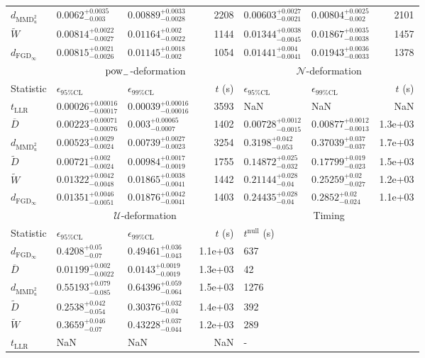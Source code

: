 \begin{tabular}{l|llr|llr}
	$d_{\mathrm{MMD}^{2}_{u}}$ & $0.0062_{-0.003}^{+0.0035}$ & $0.00889_{-0.0028}^{+0.0033}$ & 2208 & $0.00603_{-0.0021}^{+0.0027}$ & $0.00804_{-0.002}^{+0.0025}$ & 2101 \\
	$\widetilde{W}$ & $0.00814_{-0.0027}^{+0.0022}$ & $0.01164_{-0.0022}^{+0.002}$ & 1144 & $0.01344_{-0.0045}^{+0.0038}$ & $0.01867_{-0.0038}^{+0.0035}$ & 1457 \\
	$d_{\mathrm{FGD}_{\infty}}$ & $0.00815_{-0.0026}^{+0.0021}$ & $0.01145_{-0.002}^{+0.0018}$ & 1054 & $0.01441_{-0.0041}^{+0.004}$ & $0.01943_{-0.0033}^{+0.0036}$ & 1378 \\
	\toprule
	\multicolumn{1}{c}{} & \multicolumn{3}{c}{$\rm{pow}_{-}$-deformation} & \multicolumn{3}{c}{$\mathcal{N}$-deformation} \\
	Statistic & $\epsilon_{95\%\mathrm{CL}}$ & $\epsilon_{99\%\mathrm{CL}}$ & $t$ (s) & $\epsilon_{95\%\mathrm{CL}}$ & $\epsilon_{99\%\mathrm{CL}}$ & $t$ (s) \\
	\midrule
	$t_{\mathrm{LLR}}$ & $0.00026_{-0.00017}^{+0.00016}$ & $0.00039_{-0.00016}^{+0.00016}$ & 3593 & NaN & NaN & NaN \\
	$\overline{D}$ & $0.00223_{-0.00076}^{+0.00071}$ & $0.003_{-0.0007}^{+0.00065}$ & 1402 & $0.00728_{-0.0015}^{+0.0012}$ & $0.00877_{-0.0013}^{+0.0012}$ & 1.3e+03 \\
	$d_{\mathrm{MMD}^{2}_{u}}$ & $0.00523_{-0.0024}^{+0.0029}$ & $0.00739_{-0.0023}^{+0.0027}$ & 3254 & $0.3198_{-0.053}^{+0.042}$ & $0.37039_{-0.037}^{+0.037}$ & 1.7e+03 \\
	$\widetilde{D}$ & $0.00721_{-0.0024}^{+0.002}$ & $0.00984_{-0.0019}^{+0.0017}$ & 1755 & $0.14872_{-0.032}^{+0.025}$ & $0.17799_{-0.023}^{+0.019}$ & 1.5e+03 \\
	$\widetilde{W}$ & $0.01322_{-0.0048}^{+0.0042}$ & $0.01865_{-0.0041}^{+0.0038}$ & 1442 & $0.21144_{-0.04}^{+0.028}$ & $0.25259_{-0.027}^{+0.02}$ & 1.2e+03 \\
	$d_{\mathrm{FGD}_{\infty}}$ & $0.01351_{-0.0051}^{+0.0046}$ & $0.01876_{-0.0041}^{+0.0042}$ & 1403 & $0.24435_{-0.04}^{+0.028}$ & $0.2852_{-0.024}^{+0.02}$ & 1.1e+03 \\
	\toprule
	\multicolumn{1}{c}{} & \multicolumn{3}{c}{$\mathcal{U}$-deformation} & \multicolumn{3}{c}{Timing} \\
	Statistic & $\epsilon_{95\%\mathrm{CL}}$ & $\epsilon_{99\%\mathrm{CL}}$ & $t$ (s) & $t^{\mathrm{null}}$ (s) \\
	\midrule
	$d_{\mathrm{FGD}_{\infty}}$ & $0.4208_{-0.07}^{+0.05}$ & $0.49461_{-0.043}^{+0.036}$ & 1.1e+03 & 637 \\
	$\overline{D}$ & $0.01199_{-0.0022}^{+0.002}$ & $0.0143_{-0.0019}^{+0.0019}$ & 1.3e+03 & 42 \\
	$d_{\mathrm{MMD}^{2}_{u}}$ & $0.55193_{-0.085}^{+0.079}$ & $0.64396_{-0.064}^{+0.059}$ & 1.5e+03 & 1276 \\
	$\widetilde{D}$ & $0.2538_{-0.054}^{+0.042}$ & $0.30376_{-0.04}^{+0.032}$ & 1.4e+03 & 392 \\
	$\widetilde{W}$ & $0.3659_{-0.07}^{+0.046}$ & $0.43228_{-0.044}^{+0.037}$ & 1.2e+03 & 289 \\
	$t_{\mathrm{LLR}}$ & NaN & NaN & NaN & - \\
	\bottomrule
\end{tabular}